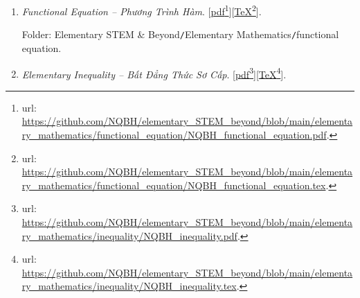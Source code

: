 \documentclass[12pt,twoside]{book}
\begin{document}
\begin{enumerate}
	Folder: {\sf Elementary STEM \& Beyond{\tt/}Elementary Mathematics{\tt/}equation \& inequation{\tt/}problem}.
	\begin{itemize}
		\item {\it Problem \& Solution: Equation \& Inequation -- Bài Tập \& Lời Giải: Phương Trình \& Bất Phương Trình}. [\href{https://github.com/NQBH/elementary_STEM_beyond/blob/main/elementary_mathematics/equation_inequation/solution/NQBH_equation_inequation_solution.pdf}{pdf}\footnote{{\sc url}: \url{https://github.com/NQBH/elementary_STEM_beyond/blob/main/elementary_mathematics/equation_inequation/solution/NQBH_equation_inequation_solution.pdf}.}][\href{https://github.com/NQBH/elementary_STEM_beyond/blob/main/elementary_mathematics/equation_inequation/solution/NQBH_equation_inequation_solution.tex}{\TeX}\footnote{{\sc url}: \url{https://github.com/NQBH/elementary_STEM_beyond/blob/main/elementary_mathematics/equation_inequation/solution/NQBH_equation_inequation_solution.tex}.}].
		
		Folder: {\sf Elementary STEM \& Beyond{\tt/}Elementary Mathematics{\tt/}equation \& inequation{\tt/}solution}.
	\end{itemize}
	\item {\it Functional Equation -- Phương Trình Hàm}. [\href{https://github.com/NQBH/elementary_STEM_beyond/blob/main/elementary_mathematics/functional_equation/NQBH_functional_equation.pdf}{pdf}\footnote{{\sc url}: \url{https://github.com/NQBH/elementary_STEM_beyond/blob/main/elementary_mathematics/functional_equation/NQBH_functional_equation.pdf}.}][\href{https://github.com/NQBH/elementary_STEM_beyond/blob/main/elementary_mathematics/functional_equation/NQBH_functional_equation.tex}{\TeX}\footnote{{\sc url}: \url{https://github.com/NQBH/elementary_STEM_beyond/blob/main/elementary_mathematics/functional_equation/NQBH_functional_equation.tex}.}].
	
	Folder: {\sf Elementary STEM \& Beyond{\tt/}Elementary Mathematics{\tt/}functional equation}.
	\item {\it Elementary Inequality -- Bất Đẳng Thức Sơ Cấp}. [\href{https://github.com/NQBH/elementary_STEM_beyond/blob/main/elementary_mathematics/inequality/NQBH_inequality.pdf}{pdf}\footnote{{\sc url}: \url{https://github.com/NQBH/elementary_STEM_beyond/blob/main/elementary_mathematics/inequality/NQBH_inequality.pdf}.}][\href{https://github.com/NQBH/elementary_STEM_beyond/blob/main/elementary_mathematics/inequality/NQBH_inequality.tex}{\TeX}\footnote{{\sc url}: \url{https://github.com/NQBH/elementary_STEM_beyond/blob/main/elementary_mathematics/inequality/NQBH_inequality.tex}.}].
	

\end{enumerate}
\end{document}
